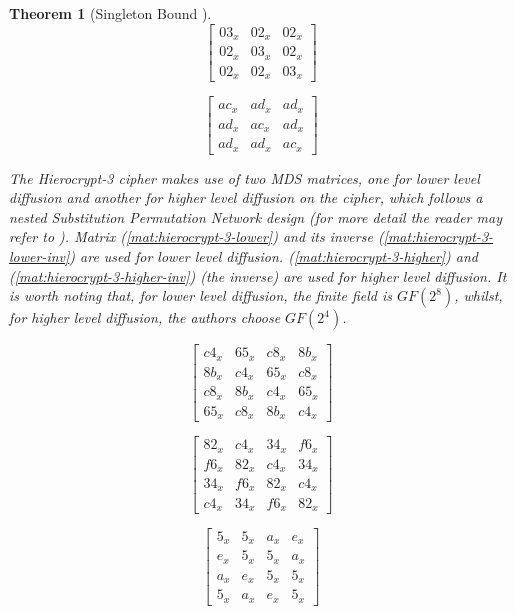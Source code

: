 \documentclass{report}
\newtheorem{theorem}{Theorem}{\bfseries}{\itshape}
\begin{document}
\begin{theorem}[Singleton Bound \cite{SloaneBook}]
\begin{equation}\label{mat:bksq}
\begin{bmatrix}
03_x & 02_x & 02_x\\
02_x & 03_x & 02_x\\
02_x & 02_x & 03_x
\end{bmatrix}
\end{equation}

\begin{equation}\label{mat:bksq-inv}
\begin{bmatrix}
ac_x & ad_x & ad_x\\
ad_x & ac_x & ad_x\\
ad_x & ad_x & ac_x
\end{bmatrix}
\end{equation}

The Hierocrypt-3 cipher makes use of two MDS matrices, one for lower level diffusion and another for higher level diffusion on the cipher, which follows a nested Substitution Permutation Network design (for more detail the reader may refer to \cite{Hierocrypt2000}). Matrix (\ref{mat:hierocrypt-3-lower}) and its inverse (\ref{mat:hierocrypt-3-lower-inv}) are used for lower level diffusion. (\ref{mat:hierocrypt-3-higher}) and (\ref{mat:hierocrypt-3-higher-inv}) (the inverse) are used for higher level diffusion. It is worth noting that, for lower level diffusion, the finite field is $GF(2^8)$, whilst, for higher level diffusion, the authors choose $GF(2^4)$.

\begin{equation}\label{mat:hierocrypt-3-lower}
\begin{bmatrix}
c4_x & 65_x & c8_x & 8b_x\\
8b_x & c4_x & 65_x & c8_x\\
c8_x & 8b_x & c4_x & 65_x\\
65_x & c8_x & 8b_x & c4_x
\end{bmatrix}
\end{equation}

\begin{equation}\label{mat:hierocrypt-3-lower-inv}
\begin{bmatrix}
82_x & c4_x & 34_x & f6_x\\
f6_x & 82_x & c4_x & 34_x\\
34_x & f6_x & 82_x & c4_x\\
c4_x & 34_x & f6_x & 82_x
\end{bmatrix}
\end{equation}

\begin{equation}\label{mat:hierocrypt-3-higher}
\begin{bmatrix}
5_x & 5_x & a_x & e_x\\
e_x & 5_x & 5_x & a_x\\
a_x & e_x & 5_x & 5_x\\
5_x & a_x & e_x & 5_x
\end{bmatrix}
\end{equation}


\end{theorem}
\end{document}
